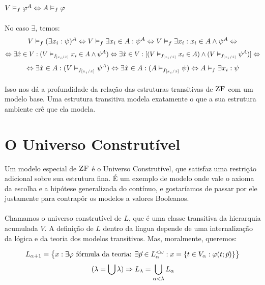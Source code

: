 \begin{theorem}{$V\vDash_f\varphi^A\Leftrightarrow A\vDash_f\varphi$}
                    \paragraph{}
                        No caso $\exists$, temos:
                        $$
                            V\vDash_f(\exists x_i:\psi)^A\Leftrightarrow
                            V\vDash_f\exists x_i\in A:\psi^A \Leftrightarrow
                            V\vDash_f\exists x_i:x_i\in A\land\psi^A \Leftrightarrow
                        $$
                        $$
                            \Leftrightarrow\exists \hat x\in V: (V\vDash_{f_{[x_i\slash\hat x]}}x_i\in A\land\psi^A) \Leftrightarrow \exists \hat x\in V :[(V\vDash_{f_{[x_i\slash\hat x]}}x_i\in A)\land(V\vDash_{f_{[x_i\slash\hat x]}}\psi^A)]\Leftrightarrow
                        $$
                        $$
                            \Leftrightarrow\exists \hat x\in A: (V\vDash_{f_{[x_i\slash\hat x]}}\psi^A) \Leftrightarrow \exists \hat x\in A: (A\vDash_{f_{[x_i\slash\hat x]}}\psi) \Leftrightarrow A\vDash_f\exists x_i:\psi
                        $$
                        \eop
                \end{theorem}
                \paragraph{}
                    Isso nos dá a profundidade da relação das estruturas transitivas de $\text{\sc ZF}$ com um modelo base. Uma estrutura transitiva modela 
                    exatamente o que a sua estrutura ambiente crê que ela modela.
    \section{O Universo Construtível}
            Um modelo especial de $\text{\sc ZF}$ é o Universo Construtível, que satisfaz uma restrição adicional sobre sua estrutura fina. É um exemplo 
            de modelo onde vale o axioma da escolha e a hipótese generalizada do contínuo, e gostaríamos de passar por ele justamente para 
            contrapôr os modelos a valores Booleanos.
        \paragraph{}
            Chamamos o universo construtível de $L$, que é uma classe transitiva da hierarquia acumulada $V$. A definição de $L$ dentro da 
            língua depende de uma internalização da lógica e da teoria dos modelos transitivos. Mas, moralmente, queremos:

        $$ L_{\alpha+1} = \SET{x : \exists \varphi \text { fórmula da teoria: }\exists \vec{p} \in L_\alpha^{<\omega}: x = \SET{t\in V_\alpha : \varphi(t; \vec{p})}} $$
        $$ (\lambda = \bigcup \lambda) \Rightarrow L_\lambda = \bigcup_{\alpha<\lambda}L_\alpha $$

